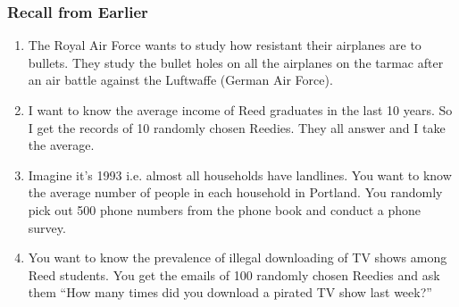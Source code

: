 \documentclass[handout]{beamer}
\begin{document}
\begin{frame}
\frametitle{Recall from Earlier}

\begin{small}
\begin{enumerate}
\item The Royal Air Force wants to study how resistant their airplanes are to bullets. They study the bullet holes on all the airplanes on the tarmac after an air battle against the Luftwaffe (German Air Force).
\item I want to know the average income of Reed graduates in the last 10 years.  So I get the records of 10 randomly chosen Reedies.  They all answer and I take the average.
\item Imagine it's 1993 i.e. almost all households have landlines.  You want to know the average number of people in each household in Portland.  You randomly pick out 500 phone numbers from the phone book and conduct a phone survey.
\item You want to know the prevalence of illegal downloading of TV shows among Reed students.  You get the emails of 100 randomly chosen Reedies and ask them ``How many times did you download a pirated TV show last week?''
\end{enumerate}
\end{small}

\end{frame}
\end{document}
